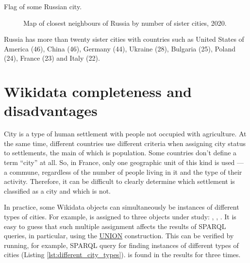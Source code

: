
\begin{marginfigure}
{
\setlength{\fboxsep}{0pt}%
\setlength{\fboxrule}{1pt}%
%
}
  \caption{Flag of some Russian city.}%
\end{marginfigure}


\begin{figure*}[h]
{
\setlength{\fboxsep}{0pt}%
\setlength{\fboxrule}{1pt}%
}
	\caption{Map of closest neighbours of Russia by number of sister cities, 2020.}
\end{figure*}

Russia has more than twenty sister cities with countries such as United States of America (46), China (46), Germany (44), Ukraine (28), Bulgaria (25), Poland (24), France (23) and Italy (22).

\section{Wikidata completeness and disadvantages}
\label{section:countries_Wikidata_completeness_and_disadvantages}

City is a type of human settlement with people not occupied with agriculture. At the same time, different countries use different criteria when assigning city status to settlements, the main of which is population. Some countries don't define a term ``city'' at all. So, in France, only one geographic unit of this kind is used — a commune, regardless of the number of people living in it and the type of their activity. Therefore, it can be difficult to clearly determine which settlement is classified as a city and which is not.

In practice, some Wikidata objects can simultaneously be instances of different types of cities. For example,  is assigned to three objects under study:  , , . It is easy to guess that such multiple assignment affects the results of SPARQL queries, in particular, using the \href{https://en.wikibooks.org/wiki/SPARQL/UNION}{UNION} construction. This can be verified by running, for example, SPARQL query for finding instances of different types of cities (Listing \ref{lst:different_city_types}).  is found in the results for three times.

